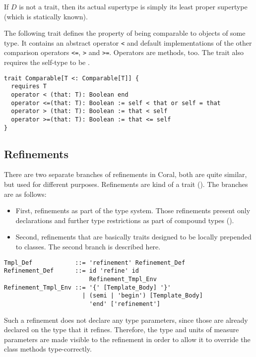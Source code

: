 If $D$ is not a trait, then its actual supertype is simply its least proper supertype (which is statically known). 

\example The following trait defines the property of being comparable to objects of some type. It contains an abstract operator \lstinline!<! and default implementations of the other comparison operators \lstinline!<=!, \lstinline!>! and \lstinline!>=!. Operators are methods, too. The trait also requires the self-type to be . 
\begin{lstlisting}
trait Comparable[T <: Comparable[T]] {
  requires T
  operator < (that: T): Boolean end
  operator <=(that: T): Boolean := self < that or self = that
  operator > (that: T): Boolean := that < self
  operator >=(that: T): Boolean := that <= self
}
\end{lstlisting}






\subsection{Refinements}
\label{sec:refinements}

There are two separate branches of refinements in Coral, both are quite similar, but used for different purposes. Refinements are kind of a trait (). The branches are as follows:
\begin{itemize}
\item[]
First, refinements as part of the type system. Those refinements present only declarations and further type restrictions as part of compound types ().

\item[]
Second, refinements that are basically traits designed to be locally prepended to classes. The second branch is described here. 
\end{itemize}

\syntax\begin{lstlisting}
Tmpl_Def            ::= 'refinement' Refinement_Def
Refinement_Def      ::= id 'refine' id 
                        Refinement_Tmpl_Env
Refinement_Tmpl_Env ::= '{' [Template_Body] '}'
                      | (semi | 'begin') [Template_Body] 
                        'end' ['refinement']
\end{lstlisting}

Such a refinement does not declare any type parameters, since those are already declared on the type that it refines. Therefore, the type and units of measure parameters are made visible to the refinement in order to allow it to override the class methods type-correctly. 

